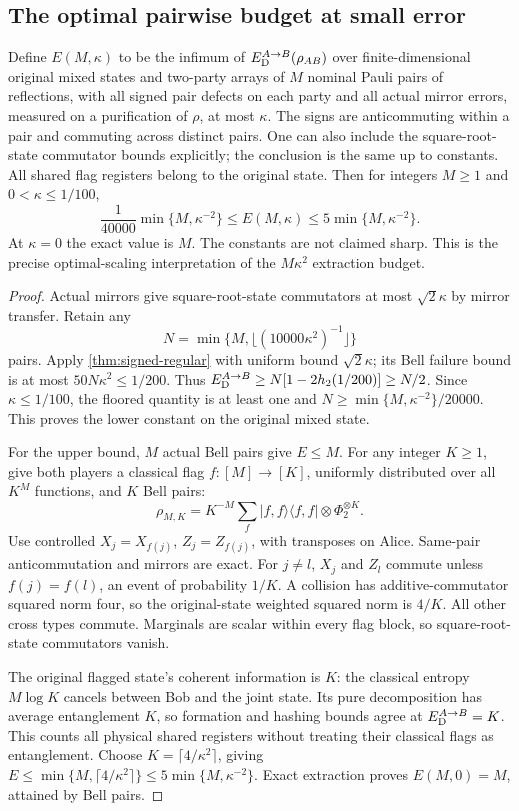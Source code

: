 \subsection{The optimal pairwise budget at small error}\label{sec:optimal-pair-budget}
\begin{theorem}\label{thm:optimal-pair-budget}
Define $E(M,\kappa)$ to be the infimum of $E_{\mathrm D}^{A\to B}(\rho_{AB})$ over finite-dimensional original mixed states and two-party arrays of $M$ nominal Pauli pairs of reflections, with all signed pair defects on each party and all actual mirror errors, measured on a purification of $\rho$, at most $\kappa$. The signs are anticommuting within a pair and commuting across distinct pairs. One can also include the square-root-state commutator bounds explicitly; the conclusion is the same up to constants. All shared flag registers belong to the original state. Then for integers $M\ge1$ and $0<\kappa\le1/100$,
\[
 \frac1{40000}\min\{M,\kappa^{-2}\}\le E(M,\kappa)\le5\min\{M,\kappa^{-2}\}.
\]
At $\kappa=0$ the exact value is $M$. The constants are not claimed sharp. This is the precise optimal-scaling interpretation of the $M\kappa^2$ extraction budget.
\end{theorem}
\begin{proof}
Actual mirrors give square-root-state commutators at most $\sqrt2\kappa$ by mirror transfer. Retain any
\[
 N=\min\{M,\lfloor(10000\kappa^2)^{-1}\rfloor\}
\]
pairs. Apply \cref{thm:signed-regular} with uniform bound $\sqrt2\kappa$; its Bell failure bound is at most $50N\kappa^2\le1/200$. Thus $E_{\mathrm D}^{A\to B}\ge N[1-2h_2(1/200)]\ge N/2$. Since $\kappa\le1/100$, the floored quantity is at least one and $N\ge\min\{M,\kappa^{-2}\}/20000$. This proves the lower constant on the original mixed state.

For the upper bound, $M$ actual Bell pairs give $E\le M$. For any integer $K\ge1$, give both players a classical flag $f:[M]\to[K]$, uniformly distributed over all $K^M$ functions, and $K$ Bell pairs:
\[
 \rho_{M,K}=K^{-M}\sum_f|f,f\rangle\langle f,f|\otimes\Phi_2^{\otimes K}.
\]
Use controlled $X_j=X_{f(j)}$, $Z_j=Z_{f(j)}$, with transposes on Alice. Same-pair anticommutation and mirrors are exact. For $j\ne l$, $X_j$ and $Z_l$ commute unless $f(j)=f(l)$, an event of probability $1/K$. A collision has additive-commutator squared norm four, so the original-state weighted squared norm is $4/K$. All other cross types commute. Marginals are scalar within every flag block, so square-root-state commutators vanish.

The original flagged state's coherent information is $K$: the classical entropy $M\log K$ cancels between Bob and the joint state. Its pure decomposition has average entanglement $K$, so formation and hashing bounds agree at $E_{\mathrm D}^{A\to B}=K$. This counts all physical shared registers without treating their classical flags as entanglement. Choose $K=\lceil4/\kappa^2\rceil$, giving $E\le\min\{M,\lceil4/\kappa^2\rceil\}\le5\min\{M,\kappa^{-2}\}$. Exact extraction proves $E(M,0)=M$, attained by Bell pairs.
\end{proof}

